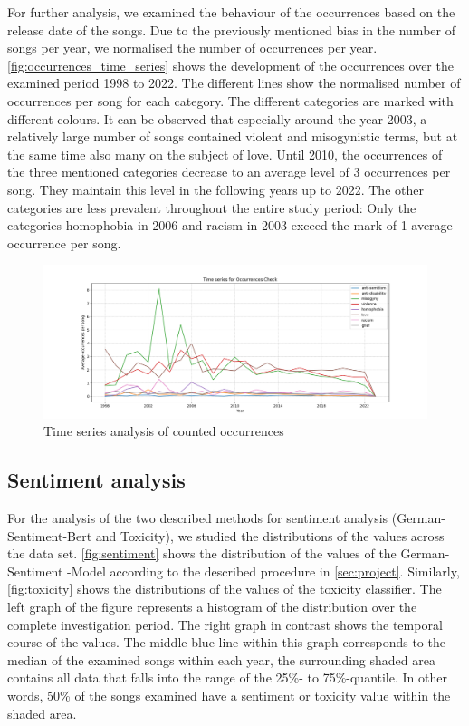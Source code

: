For further analysis, we examined the behaviour of the occurrences based on the release date of the songs. Due to the previously mentioned bias in the number of songs per year, we normalised the number of occurrences per year. \autoref{fig:occurrences_time_series} shows the development of the occurrences over the examined period 1998 to 2022. The different lines show the normalised number of occurrences per song for each category. The different categories are marked with different colours. It can be observed that especially around the year 2003, a relatively large number of songs contained violent and misogynistic terms, but at the same time also many on the subject of love. Until 2010, the occurrences of the three mentioned categories decrease to an average level of 3 occurrences per song. They maintain this level in the following years up to 2022. The other categories are less prevalent throughout the entire study period: Only the categories homophobia in 2006 and racism in 2003 exceed the mark of 1 average occurrence per song.

\begin{figure}[!htb]
    \centering
    \includegraphics[width=\textwidth]{figures/time_series_occurrences.png}
    \caption{Time series analysis of counted occurrences}
    \label{fig:occurrences_time_series}
\end{figure}

\subsection*{Sentiment analysis}

For the analysis of the two described methods for sentiment analysis (German-Sentiment-Bert and Toxicity), we studied the distributions of the values across the data set. \autoref{fig:sentiment} shows the distribution of the values of the German-Sentiment -Model according to the described procedure in \autoref{sec:project}. Similarly, \autoref{fig:toxicity} shows the distributions of the values of the toxicity classifier. The left graph of the figure represents a histogram of the distribution over the complete investigation period. The right graph in contrast shows the temporal course of the values. The middle blue line within this graph corresponds to the median of the examined songs within each year, the surrounding shaded area contains all data that falls into the range of the 25\%- to 75\%-quantile. In other words, 50\% of the songs examined have a sentiment or toxicity value within the shaded area.

